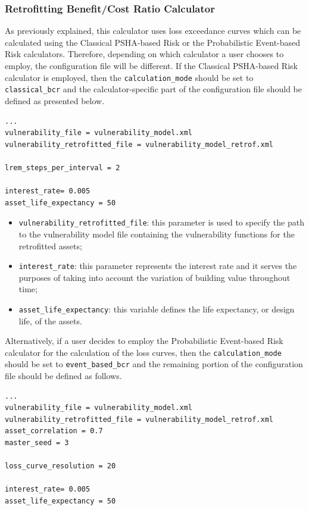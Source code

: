 \subsubsection{Retrofitting Benefit/Cost Ratio Calculator}
As previously explained, this calculator uses loss exceedance curves which can be calculated using the Classical PSHA-based Risk or the Probabilistic Event-based Risk calculators. Therefore, depending on which calculator a user chooses to employ, the configuration file will be different. If the Classical PSHA-based Risk calculator is employed, then the \Verb+calculation_mode+ should be set to \Verb+classical_bcr+ and the calculator-specific part of the configuration file should be defined as presented below.

\begin{Verbatim}[frame=single, commandchars=\\\{\}, samepage=true]
...
vulnerability_file = vulnerability_model.xml
vulnerability_retrofitted_file = vulnerability_model_retrof.xml

lrem_steps_per_interval = 2

interest_rate= 0.005
asset_life_expectancy = 50
\end{Verbatim}

\begin{itemize}
\item  \Verb+vulnerability_retrofitted_file+: this parameter is used to specify the path to the \gls{vulnerability model} file containing the \glspl{vulnerability function} for the retrofitted assets;  
\item  \Verb+interest_rate+: this parameter represents the interest rate and it serves the purposes of taking into account the variation of building value throughout time;
\item  \Verb+asset_life_expectancy+: this variable defines the life expectancy, or design life, of the assets.
\end{itemize}

Alternatively, if a user decides to employ the Probabilistic Event-based Risk calculator for the calculation of the loss curves, then the \Verb+calculation_mode+ should be set to \Verb+event_based_bcr+ and the remaining portion of the configuration file should be defined as follows.

\begin{Verbatim}[frame=single, commandchars=\\\{\}, samepage=true]
...
vulnerability_file = vulnerability_model.xml
vulnerability_retrofitted_file = vulnerability_model_retrof.xml
asset_correlation = 0.7
master_seed = 3

loss_curve_resolution = 20

interest_rate= 0.005
asset_life_expectancy = 50
\end{Verbatim}